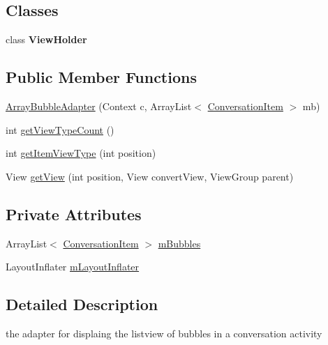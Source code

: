 \subsection*{Classes}
\begin{DoxyCompactItemize}
\item 
class {\bfseries View\+Holder}
\end{DoxyCompactItemize}
\subsection*{Public Member Functions}
\begin{DoxyCompactItemize}
\item 
\hyperlink{a00002_adbd2cc40c8a00dabffd7b33ef3c7d247}{Array\+Bubble\+Adapter} (Context c, Array\+List$<$ \hyperlink{a00008}{Conversation\+Item} $>$ mb)
\item 
int \hyperlink{a00002_a8085b7d181222b03ef9547a4833ce997}{get\+View\+Type\+Count} ()
\item 
int \hyperlink{a00002_a6d3ccfe62c0e893718ad6266b6207e53}{get\+Item\+View\+Type} (int position)
\item 
View \hyperlink{a00002_af6292d542d7937de5b4044234a2db905}{get\+View} (int position, View convert\+View, View\+Group parent)
\end{DoxyCompactItemize}
\subsection*{Private Attributes}
\begin{DoxyCompactItemize}
\item 
Array\+List$<$ \hyperlink{a00008}{Conversation\+Item} $>$ \hyperlink{a00002_a347536a1eb8525c224f457613e34a80f}{m\+Bubbles}
\item 
Layout\+Inflater \hyperlink{a00002_a4e02ab86d39fcfd990b8dd2f36ccc3c9}{m\+Layout\+Inflater}
\end{DoxyCompactItemize}


\subsection{Detailed Description}
the adapter for displaing the listview of bubbles in a conversation activity 

